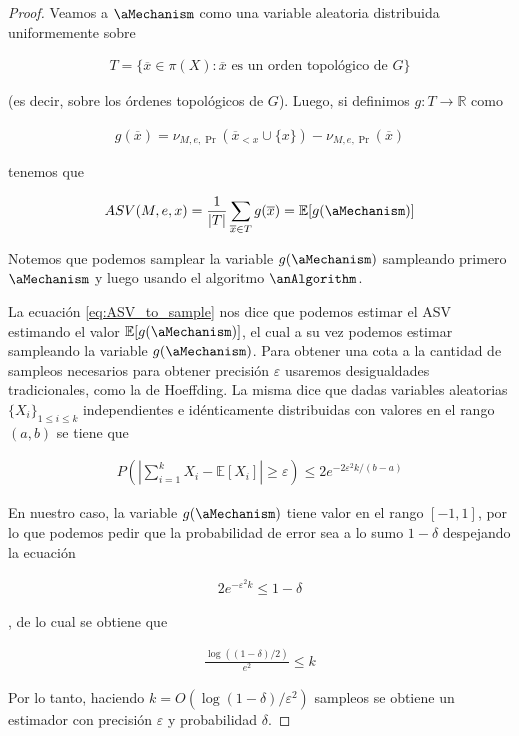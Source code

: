 \begin{proof}
    Veamos a $\aMechanism$ como una variable aleatoria distribuida uniformemente sobre 
    
    \begin{align*}
        T = \{\overline{x} \in \pi(X) : \overline{x} \text{ es un orden topológico de $G$}\}
    \end{align*}
    
    (es decir, sobre los órdenes topológicos de $G$). Luego, si definimos $g: T \to \mathbb{R}$ como

    \begin{align*}
        g(\overline{x}) = \nu_{M, e, \Pr}(\overline{x}_{<x} \cup \{x\}) - \nu_{M, e, \Pr}(\overline{x})
    \end{align*}

    tenemos que

    \begin{align}\label{eq:ASV_to_sample}
        ASV(M, e, x) = \frac{1}{|T|} 
        \sum_{\overline{x} \in T} g(\overline{x}) = \mathbb{E}[g(\aMechanism)]
    \end{align}

    Notemos que podemos samplear la variable $g(\aMechanism)$ sampleando primero $\aMechanism$ y luego usando el algoritmo $\anAlgorithm$.
    
    La ecuación \eqref{eq:ASV_to_sample} nos dice que podemos estimar el ASV estimando el valor $\mathbb{E}[g(\aMechanism)]$, el cual a su vez podemos estimar sampleando la variable $g(\aMechanism)$. Para obtener una cota a la cantidad de sampleos necesarios para obtener precisión $\varepsilon$ usaremos desigualdades tradicionales, como la de Hoeffding. La misma dice que dadas variables aleatorias $\{X_i\}_{1 \leq i \leq k}$ independientes e idénticamente distribuidas con valores en el rango $(a, b)$ se tiene que

    \begin{align*}
        P(|\sum_{i=1}^k X_i - \mathbb{E}[X_i]| \geq \varepsilon) \leq 2e^{-2\varepsilon^2k / (b-a)}
    \end{align*}

    En nuestro caso, la variable $g(\aMechanism)$ tiene valor en el rango $[-1, 1]$, por lo que podemos pedir que la probabilidad de error sea a lo sumo $1-\delta$ despejando la ecuación

    \begin{align*}
        2e^{-\varepsilon^2 k} \leq 1 - \delta
    \end{align*}

    , de lo cual se obtiene que

    \begin{align*}
        \frac{\log ((1 - \delta) / 2)}{e^2} \leq k
    \end{align*}

    Por lo tanto, haciendo $k = O(\log(1-\delta) / \varepsilon^2)$ sampleos se obtiene un estimador con precisión $\varepsilon$ y probabilidad $\delta$.
    
\end{proof}


